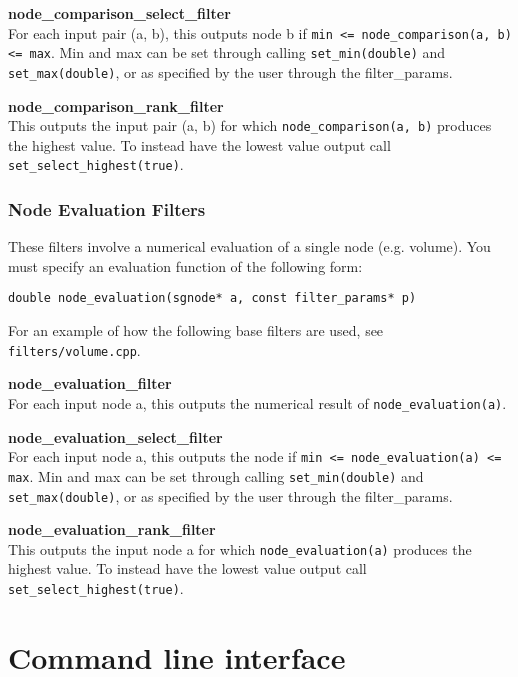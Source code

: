 \textbf{node\_comparison\_select\_filter} \\
For each input pair (a, b), this outputs node b if 
\texttt{min <= node\_comparison(a, b) <= max}. 
Min and max can be set through calling \texttt{set\_min(double)} 
and \texttt{set\_max(double)}, or as specified by the user through the filter\_params. 

\textbf{node\_comparison\_rank\_filter} \\
This outputs the input pair (a, b) for which \texttt{node\_comparison(a, b)} 
produces the highest value. To instead have the lowest value output call \texttt{set\_select\_highest(true)}.


\subsubsection{Node Evaluation Filters}
These filters involve a numerical evaluation of a single node (e.g. volume). 
You must specify an evaluation function of the following form:
\begin{verbatim}
double node_evaluation(sgnode* a, const filter_params* p)
\end{verbatim}

For an example of how the following base filters are used, see \texttt{filters/volume.cpp}.

\textbf{node\_evaluation\_filter} \\
For each input node a, this outputs the numerical result of \texttt{node\_evaluation(a)}. 

\textbf{node\_evaluation\_select\_filter} \\
For each input node a, this outputs the node if 
\texttt{min <= node\_evaluation(a) <= max}. 
Min and max can be set through calling \texttt{set\_min(double)} 
and \texttt{set\_max(double)}, or as specified by the user through the filter\_params. 

\textbf{node\_evaluation\_rank\_filter} \\
This outputs the input node a for which \texttt{node\_evaluation(a)} 
produces the highest value. To instead have the lowest value output call \texttt{set\_select\_highest(true)}.


\section{Command line interface}

